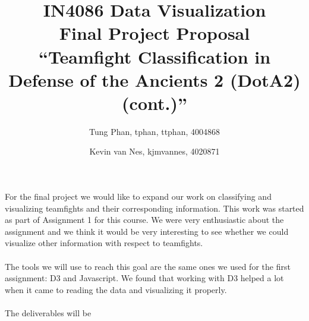 \documentclass[11pt,twoside,a4paper]{article}
\title{
  IN4086 Data Visualization\\
  Final Project Proposal\\
  ``Teamfight Classification in Defense of the Ancients 2 (DotA2) (cont.)''
}
\author{
    Tung Phan, tphan, ttphan, 4004868 \and
    Kevin van Nes, kjmvannes, 4020871
}
\begin{document}
\maketitle

For the final project we would like to expand our work on classifying and visualizing teamfights and their corresponding information. This work was started as part of Assignment 1 for this course. We were very enthusiastic about the assignment and we think it would be very interesting to see whether we could visualize other information with respect to teamfights.\\
\\
The tools we will use to reach this goal are the same ones we used for the first assignment: D3 and Javascript. We found that working with D3 helped a lot when it came to reading the data and visualizing it properly.\\
\\
The deliverables will be 
\end{document}
